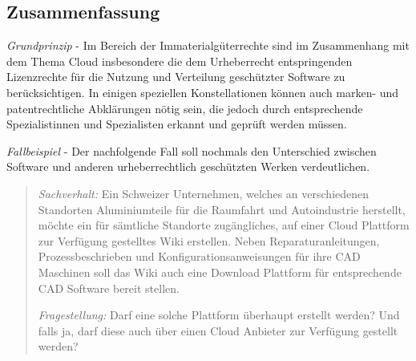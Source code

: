 \documentclass[a4paper,pointlessnumbers]{scrreprt}
\begin{document}
\subsection{Zusammenfassung}
\textit{Grundprinzip} - Im Bereich der Immaterialgüterrechte sind im Zusammenhang mit dem Thema Cloud insbesondere die dem Urheberrecht entspringenden Lizenzrechte für die Nutzung und Verteilung geschützter Software zu berücksichtigen. In einigen speziellen Konstellationen können auch marken- und patentrechtliche Abklärungen nötig sein, die jedoch durch entsprechende Spezialistinnen und Spezialisten erkannt und geprüft werden müssen.

\textit{Fallbeispiel} - Der nachfolgende Fall soll nochmals den Unterschied zwischen Software und anderen urheberrechtlich geschützten Werken verdeutlichen.
\begin{quote}
\textit{Sachverhalt:} Ein Schweizer Unternehmen, welches an verschiedenen Standorten Aluminiumteile für die Raumfahrt und Autoindustrie herstellt, möchte ein für sämtliche Standorte zugängliches, auf einer Cloud Plattform zur Verfügung gestelltes Wiki erstellen. Neben Reparaturanleitungen, Prozessbeschrieben und Konfigurationsanweisungen für ihre CAD Maschinen soll das Wiki auch eine Download Plattform für entsprechende CAD Software bereit stellen. 

\textit{Fragestellung:} Darf eine solche Plattform überhaupt erstellt werden? Und falls ja, darf diese auch über einen Cloud Anbieter zur Verfügung gestellt werden?


\end{quote}
\end{document}
